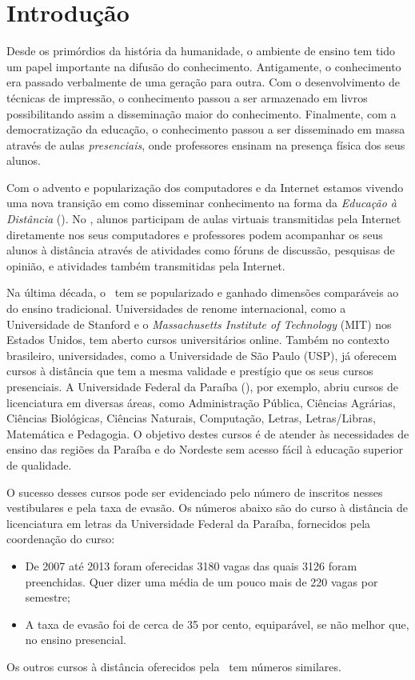 \chapter{Introdução}

Desde os primórdios da história da humanidade, o ambiente de ensino tem tido um papel
importante na difusão do conhecimento. Antigamente, o conhecimento era passado
verbalmente de uma geração para outra. Com o desenvolvimento de técnicas de
impressão, o conhecimento
passou a ser armazenado em livros possibilitando assim a disseminação maior do conhecimento. 
Finalmente, com a democratização da educação, o conhecimento passou a ser disseminado em massa 
através de aulas \emph{presenciais}, onde professores ensinam na presença física dos seus alunos. 

Com o advento e popularização dos computadores e da Internet 
estamos vivendo uma nova transição em como disseminar conhecimento na forma da \emph{Educação à Distância} (\ead). 
No \ead, alunos participam de aulas virtuais transmitidas pela Internet
diretamente nos seus computadores
e professores podem acompanhar os seus alunos à distância através de atividades como 
fóruns de discussão, pesquisas de opinião, e atividades também transmitidas
pela Internet.

Na última década, o \ead\ tem se popularizado e ganhado dimensões comparáveis ao do ensino 
tradicional. Universidades de renome internacional, como a Universidade de Stanford e o \emph{Massachusetts Institute of 
Technology} (MIT) nos Estados Unidos, tem aberto cursos universitários online. Também no contexto brasileiro, 
universidades, como a Universidade de São Paulo (USP), já oferecem cursos 
à distância que tem a mesma validade e prestígio que os seus cursos presenciais. 
A Universidade Federal da Paraíba (\ufpb), por exemplo, abriu cursos de licenciatura em 
diversas áreas, como Administração Pública, Ciências Agrárias, Ciências Biológicas, Ciências Naturais,
Computação, Letras, Letras/Libras, Matemática e Pedagogia. O objetivo destes cursos
é de atender às necessidades de ensino das regiões da Paraíba e do Nordeste sem acesso fácil
à educação superior de qualidade. 

O sucesso desses cursos pode ser evidenciado pelo número de inscritos nesses vestibulares e pela taxa de 
evasão. Os números abaixo são do curso à distância de licenciatura em letras da Universidade Federal da Paraíba, fornecidos pela 
coordenação do curso:
\begin{itemize}
 \item De 2007 até 2013 foram oferecidas 3180 vagas das quais 3126 foram preenchidas. 
 Quer dizer uma média de um pouco mais de 220 vagas por semestre;
 
 \item A taxa de evasão  foi de cerca de 
35 por cento, equiparável, se não melhor que, no ensino presencial.
\end{itemize}
 Os outros cursos à distância oferecidos pela \ufpb\  tem números similares.

